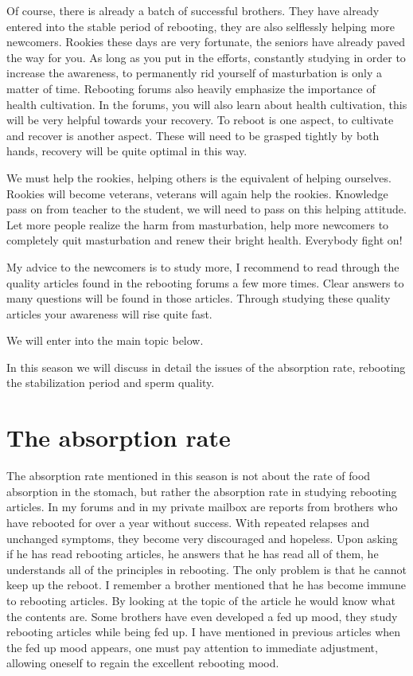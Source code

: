 \documentclass[
]{book}
\begin{document}
Of course, there is already a batch of successful brothers. They have already entered into the stable period of rebooting, they are also selflessly helping more newcomers. Rookies these days are very fortunate, the seniors have already paved the way for you. As long as you put in the efforts, constantly studying in order to increase the awareness, to permanently rid yourself of masturbation is only a matter of time. Rebooting forums also heavily emphasize the importance of health cultivation. In the forums, you will also learn about health cultivation, this will be very helpful towards your recovery. To reboot is one aspect, to cultivate and recover is another aspect. These will need to be grasped tightly by both hands, recovery will be quite optimal in this way.

We must help the rookies, helping others is the equivalent of helping ourselves. Rookies will become veterans, veterans will again help the rookies. Knowledge pass on from teacher to the student, we will need to pass on this helping attitude. Let more people realize the harm from masturbation, help more newcomers to completely quit masturbation and renew their bright health. Everybody fight on!

My advice to the newcomers is to study more, I recommend to read through the quality articles found in the rebooting forums a few more times. Clear answers to many questions will be found in those articles. Through studying these quality articles your awareness will rise quite fast.

We will enter into the main topic below.

In this season we will discuss in detail the issues of the absorption rate, rebooting the stabilization period and sperm quality.

\hypertarget{the-absorption-rate}{%
\section{The absorption rate}\label{the-absorption-rate}}

The absorption rate mentioned in this season is not about the rate of food absorption in the stomach, but rather the absorption rate in studying rebooting articles. In my forums and in my private mailbox are reports from brothers who have rebooted for over a year without success. With repeated relapses and unchanged symptoms, they become very discouraged and hopeless. Upon asking if he has read rebooting articles, he answers that he has read all of them, he understands all of the principles in rebooting. The only problem is that he cannot keep up the reboot. I remember a brother mentioned that he has become immune to rebooting articles. By looking at the topic of the article he would know what the contents are. Some brothers have even developed a fed up mood, they study rebooting articles while being fed up. I have mentioned in previous articles when the fed up mood appears, one must pay attention to immediate adjustment, allowing oneself to regain the excellent rebooting mood.
\end{document}
